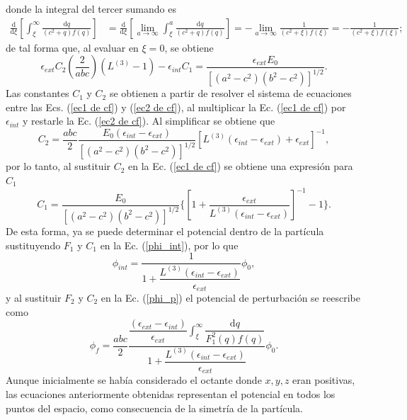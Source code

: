 donde la integral del tercer sumando es
\begin{align*}
    \frac{\text{d}}{\text{d}\xi}\left[\int_{\xi}^{\infty}\frac{\text{d}q}{(c^2+q)f(q)}\right]&=\frac{\text{d}}{\text{d}\xi}\left[\lim_{a\to\infty}\int_{\xi}^{a}\frac{\text{d}q}{(c^2+q)f(q)}\right]=-\lim_{a\to\infty}\frac{1}{(c^2+\xi)f(\xi)}=-\frac{1}{(c^2+\xi)f(\xi)};
\end{align*}
de tal forma que, al evaluar en $\xi=0$, se obtiene
\begin{equation}
    \epsilon_{ext} C_2\left(\frac{2}{abc}\right)\left(L^{(3)}-1\right)- \epsilon_{int} C_1=\frac{\epsilon_{ext} E_0}{[(a^2-c^2)(b^2-c^2)]^{1/2}}.
     \label{ec2 de cf}
\end{equation}
Las constantes $C_1$ y $C_2$ se obtienen a partir de  resolver el sistema de ecuaciones entre las Ecs. (\ref{ec1 de cf}) y (\ref{ec2 de cf}), al multiplicar la Ec. (\ref{ec1 de cf}) por $\epsilon_{int}$ y restarle la Ec. (\ref{ec2 de cf}). Al simplificar se obtiene que
\begin{equation*}
    C_2=\frac{abc}{2}\frac{E_0(\epsilon_{int}-\epsilon_{ext})}{[(a^2-c^2)(b^2-c^2)]^{1/2}}\left[L^{(3)}(\epsilon_{int}-\epsilon_{ext})+\epsilon_{ext}\right]^{-1},
\end{equation*}
por lo tanto, al sustituir $C_2$ en la Ec. (\ref{ec1 de cf}) se obtiene una expresión para $C_1$
\begin{equation*}
    C_1=\frac{E_0}{[(a^2-c^2)(b^2-c^2)]^{1/2}}\Bigg\{ \left[1+\frac{\epsilon_{ext}}{L^{(3)}(\epsilon_{int}-\epsilon_{ext})}\right]^{-1}-1\Bigg\}.
\end{equation*}
De esta forma, ya se puede determinar el potencial dentro de la partícula sustituyendo $F_1$ y $C_1$ en la Ec. (\ref{phi_int}), por lo que
\begin{equation}
	\phi_{int}=\frac{1}{1+\dfrac{L^{(3)}(\epsilon_{int}-\epsilon_{ext})}{\epsilon_{ext}}}\phi_0,
\end{equation}
y al sustituir $F_2$ y $C_2$ en la Ec. (\ref{phi_p}) el potencial de perturbación se reescribe como
\begin{equation}
	\phi_f=\frac{abc}{2}\frac{\dfrac{(\epsilon_{ext}-\epsilon_{int})}{\epsilon_{ext}}{\displaystyle\int_{\xi}^{\infty}}\dfrac{\text{d}q}{F_1^2(q)f(q)}}{1+\dfrac{L^{(3)}(\epsilon_{int}-\epsilon_{ext})}{\epsilon_{ext}}}\phi_0.
\end{equation}
Aunque inicialmente se había considerado el octante donde $x,y,z$ eran positivas, las ecuaciones anteriormente obtenidas representan el potencial en todos los puntos del espacio, como consecuencia de la simetría de la partícula.\\

